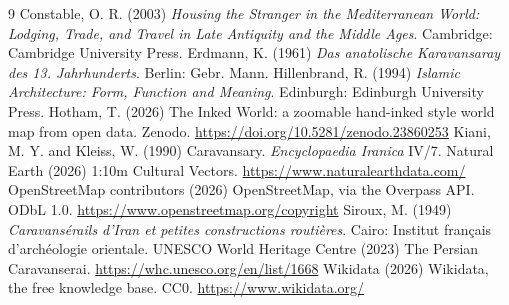 \documentclass[11pt,a4paper]{article}
\begin{document}

\begin{thebibliography}{9}
 Constable, O. R. (2003) \emph{Housing the Stranger in the Mediterranean World: Lodging, Trade, and Travel in Late Antiquity and the Middle Ages}. Cambridge: Cambridge University Press.
 Erdmann, K. (1961) \emph{Das anatolische Karavansaray des 13. Jahrhunderts}. Berlin: Gebr. Mann.
 Hillenbrand, R. (1994) \emph{Islamic Architecture: Form, Function and Meaning}. Edinburgh: Edinburgh University Press.
 Hotham, T. (2026) The Inked World: a zoomable hand-inked style world map from open data. Zenodo. \url{https://doi.org/10.5281/zenodo.23860253}
 Kiani, M. Y. and Kleiss, W. (1990) Caravansary. \emph{Encyclopaedia Iranica} IV/7.
 Natural Earth (2026) 1:10m Cultural Vectors. \url{https://www.naturalearthdata.com/}
 OpenStreetMap contributors (2026) OpenStreetMap, via the Overpass API. ODbL 1.0. \url{https://www.openstreetmap.org/copyright}
 Siroux, M. (1949) \emph{Caravansérails d'Iran et petites constructions routières}. Cairo: Institut français d'archéologie orientale.
 UNESCO World Heritage Centre (2023) The Persian Caravanserai. \url{https://whc.unesco.org/en/list/1668}
 Wikidata (2026) Wikidata, the free knowledge base. CC0. \url{https://www.wikidata.org/}
\end{thebibliography}
\end{document}
